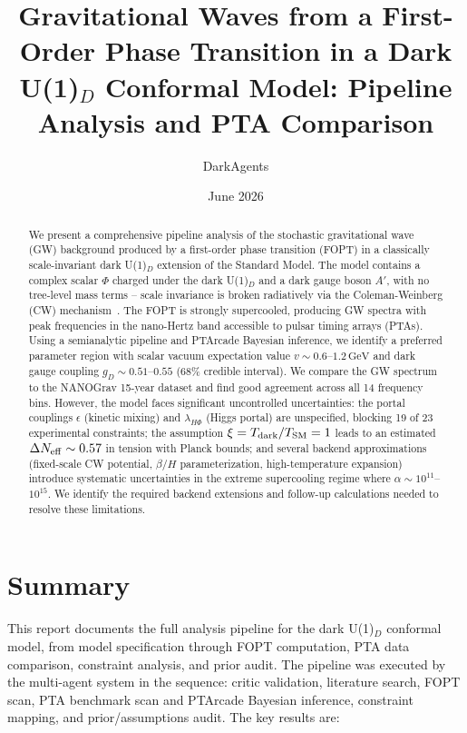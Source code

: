 \documentclass[a4paper,11pt]{article}
\title{Gravitational Waves from a First-Order Phase Transition in a Dark U(1)$_D$ Conformal Model: Pipeline Analysis and PTA Comparison}
\author{DarkAgents}
\date{June 2026}
\newcommand{\GeV}{\,\text{GeV}}
\begin{document}
\maketitle

\begin{abstract}
We present a comprehensive pipeline analysis of the stochastic gravitational wave (GW) background produced by a first-order phase transition (FOPT) in a classically scale-invariant dark U(1)$_D$ extension of the Standard Model. The model contains a complex scalar $\Phi$ charged under the dark U(1)$_D$ and a dark gauge boson $A'$, with no tree-level mass terms -- scale invariance is broken radiatively via the Coleman-Weinberg (CW) mechanism~\cite{coleman1973cw}. The FOPT is strongly supercooled, producing GW spectra with peak frequencies in the nano-Hertz band accessible to pulsar timing arrays (PTAs). Using a semianalytic pipeline and PTArcade Bayesian inference, we identify a preferred parameter region with scalar vacuum expectation value $v \sim 0.6$--$1.2\GeV$ and dark gauge coupling $g_D \sim 0.51$--$0.55$ (68\% credible interval). We compare the GW spectrum to the NANOGrav 15-year dataset and find good agreement across all 14 frequency bins. However, the model faces significant uncontrolled uncertainties: the portal couplings $\epsilon$ (kinetic mixing) and $\lambda_{H\Phi}$ (Higgs portal) are unspecified, blocking 19 of 23 experimental constraints; the assumption $\xi = T_{\rm dark}/T_{\rm SM} = 1$ leads to an estimated $\Delta N_{\rm eff} \sim 0.57$ in tension with Planck bounds; and several backend approximations (fixed-scale CW potential, $\beta/H$ parameterization, high-temperature expansion) introduce systematic uncertainties in the extreme supercooling regime where $\alpha \sim 10^{11}$--$10^{15}$. We identify the required backend extensions and follow-up calculations needed to resolve these limitations.
\end{abstract}

\section{Summary}

This report documents the full analysis pipeline for the dark U(1)$_D$ conformal model, from model specification through FOPT computation, PTA data comparison, constraint analysis, and prior audit. The pipeline was executed by the multi-agent system in the sequence: critic validation, literature search, FOPT scan, PTA benchmark scan and PTArcade Bayesian inference, constraint mapping, and prior/assumptions audit. The key results are:
\end{document}
